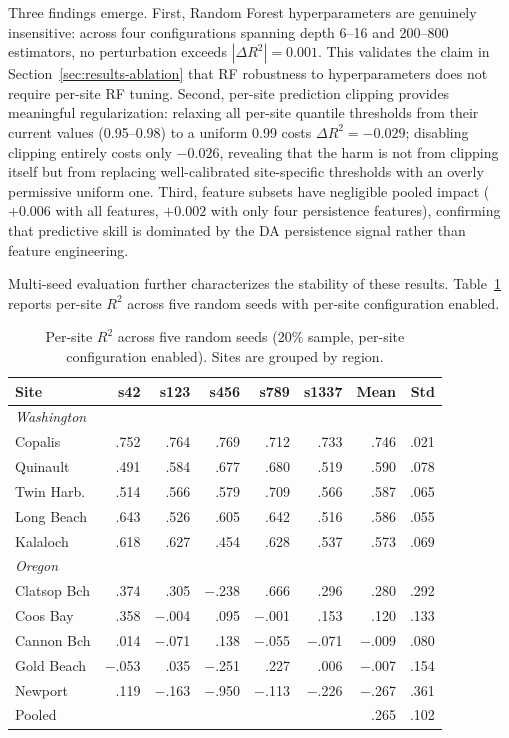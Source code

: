\documentclass[toxins,article,submit,moreauthors]{Definitions/mdpi}
\begin{document}
Three findings emerge. First, Random Forest hyperparameters are genuinely insensitive: across four configurations spanning depth 6--16 and 200--800 estimators, no perturbation exceeds $|\Delta R^2| = 0.001$. This validates the claim in Section~\ref{sec:results-ablation} that RF robustness to hyperparameters does not require per-site RF tuning. Second, per-site prediction clipping provides meaningful regularization: relaxing all per-site quantile thresholds from their current values (0.95--0.98) to a uniform 0.99 costs $\Delta R^2 = -0.029$; disabling clipping entirely costs only $-0.026$, revealing that the harm is not from clipping itself but from replacing well-calibrated site-specific thresholds with an overly permissive uniform one. Third, feature subsets have negligible pooled impact ($+0.006$ with all features, $+0.002$ with only four persistence features), confirming that predictive skill is dominated by the DA persistence signal rather than feature engineering.

Multi-seed evaluation further characterizes the stability of these results. Table~\ref{tab:seed-stability} reports per-site $R^2$ across five random seeds with per-site configuration enabled.

\begin{table}[H]
\caption{Per-site $R^2$ across five random seeds (20\% sample, per-site configuration enabled). Sites are grouped by region.}
\label{tab:seed-stability}
\centering\scriptsize
\begin{tabular*}{\linewidth}{@{\extracolsep{\fill}}lrrrrrrr}
\toprule
\textbf{Site} & \textbf{s42} & \textbf{s123} & \textbf{s456} & \textbf{s789} & \textbf{s1337} & \textbf{Mean} & \textbf{Std} \\
\midrule
\multicolumn{8}{l}{\textit{Washington}} \\
Copalis      & .752 & .764 & .769 & .712 & .733 & .746 & .021 \\
Quinault     & .491 & .584 & .677 & .680 & .519 & .590 & .078 \\
Twin Harb.   & .514 & .566 & .579 & .709 & .566 & .587 & .065 \\
Long Beach   & .643 & .526 & .605 & .642 & .516 & .586 & .055 \\
Kalaloch     & .618 & .627 & .454 & .628 & .537 & .573 & .069 \\
\midrule
\multicolumn{8}{l}{\textit{Oregon}} \\
Clatsop Bch  & .374 & .305 & $-$.238 & .666 & .296 & .280 & .292 \\
Coos Bay     & .358 & $-$.004 & .095 & $-$.001 & .153 & .120 & .133 \\
Cannon Bch   & .014 & $-$.071 & .138 & $-$.055 & $-$.071 & $-$.009 & .080 \\
Gold Beach   & $-$.053 & .035 & $-$.251 & .227 & .006 & $-$.007 & .154 \\
Newport      & .119 & $-$.163 & $-$.950 & $-$.113 & $-$.226 & $-$.267 & .361 \\
\midrule
\multicolumn{2}{l}{Pooled} & & & & & .265 & .102 \\
\bottomrule
\end{tabular*}
\end{table}
\end{document}
